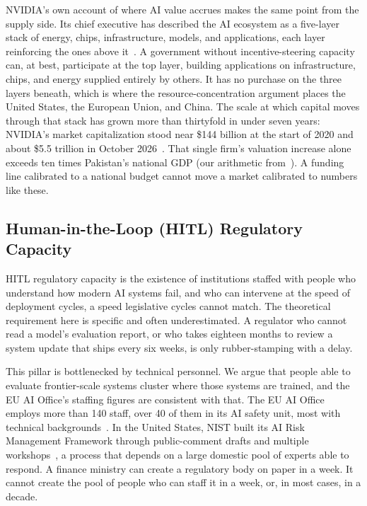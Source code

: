 \documentclass{ieeeaccess}
\begin{document}
NVIDIA's own account of where AI value accrues makes the same point from the supply side. Its chief executive has described the AI ecosystem as a five-layer stack of energy, chips, infrastructure, models, and applications, each layer reinforcing the ones above it~\cite{huang2026fivelayers}.
A government without incentive-steering capacity can, at best, participate at the top layer, building applications on infrastructure, chips, and energy supplied entirely by others. It has no purchase on the three layers beneath, which is where the resource-concentration argument places the United States, the European Union, and China. The scale at which capital moves through that stack has grown more than thirtyfold in under seven years: NVIDIA's market capitalization stood near \$144 billion at the start of 2020 and about \$5.5 trillion in October 2026~\cite{nvidia2026marketcap}.
That single firm's valuation increase alone exceeds ten times Pakistan's national GDP (our arithmetic from~\cite{nvidia2026marketcap,imf2025pakistangdp}). A funding line calibrated to a national budget cannot move a market calibrated to numbers like these.

\subsection{Human-in-the-Loop (HITL) Regulatory Capacity}

HITL regulatory capacity is the existence of institutions staffed with people who understand how modern AI systems fail, and who can intervene at the speed of deployment cycles, a speed legislative cycles cannot match. The theoretical requirement here is specific and often underestimated. A regulator who cannot read a model's evaluation report, or who takes eighteen months to review a system update that ships every six weeks, is only rubber-stamping with a delay.

This pillar is bottlenecked by technical personnel. We argue that people able to evaluate frontier-scale systems cluster where those systems are trained, and the EU AI Office's staffing figures are consistent with that. The EU AI Office employs more than 140 staff, over 40 of them in its AI safety unit, most with technical backgrounds~\cite{euaioffice2026staffing}.
In the United States, NIST built its AI Risk Management Framework through public-comment drafts and multiple workshops~\cite{nist2023airmf}, a process that depends on a large domestic pool of experts able to respond.
A finance ministry can create a regulatory body on paper in a week. It cannot create the pool of people who can staff it in a week, or, in most cases, in a decade.
\end{document}
